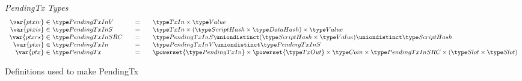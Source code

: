 \begin{figure*}[htb]
  \emph{PendingTx Types}
  \begin{equation*}
    \begin{array}{r@{~\in~}l@{\qquad=\qquad}l}
      \var{ptxiv}
      & \PendingTxInV
      & \TxIn \times \Value
      \\
      \var{ptxis}
      & \PendingTxInS
      & \TxIn \times (\HashScr \times \HashDat) \times \Value
      \\
      \var{ptxrs}
      & \PendingTxInSRC
      & \PendingTxInS \uniondistinct (\HashScr \times \Value) \uniondistinct \HashScr
      \\
      \var{ptxi}
      & \PendingTxIn
      & \PendingTxInV \uniondistinct \PendingTxInS
      \\
      \var{ptx}
      & \PendingTx
      & \powerset{\PendingTxIn} \times  \powerset{\TxOut} \times \Coin \times
      \PendingTxInSRC \times (\Slot\times\Slot)
      \\
    \end{array}
  \end{equation*}
  \caption{Definitions used to make PendingTx}
  \label{fig:defs:utxo-pending}
\end{figure*}

